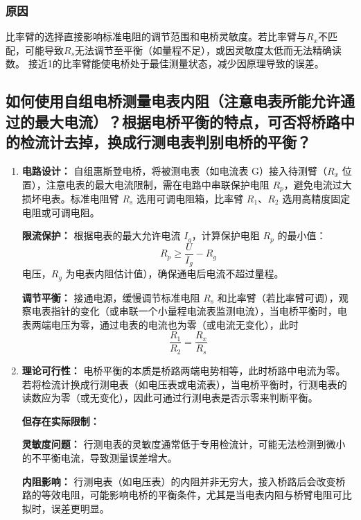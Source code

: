 \documentclass{../template/Report}%
\begin{document}
\begin{fullreportonly}
\subsubsection{原因}
比率臂的选择直接影响标准电阻的调节范围和电桥灵敏度。若比率臂与$R_x$不匹配，可能导致$R_s$无法调节至平衡（如量程不足），或因灵敏度太低而无法精确读数。
接近1的比率臂能使电桥处于最佳测量状态，减少因原理导致的误差。
\subsection{如何使用自组电桥测量电表内阻（注意电表所能允许通过的最大电流）？根据电桥平衡的特点，可否将桥路中的检流计去掉，换成行测电表判别电桥的平衡？}

\begin{enumerate}
    \item \textbf{电路设计：} 自组惠斯登电桥，将被测电表（如电流表 G）接入待测臂（$R_x$ 位置），注意电表的最大电流限制，需在电路中串联保护电阻 $R_p$，避免电流过大损坏电表。标准电阻臂 $R_s$ 选用可调电阻箱，比率臂 $R_1$、$R_2$ 选用高精度固定电阻或可调电阻。

    \textbf{限流保护：} 根据电表的最大允许电流 $I_g$，计算保护电阻 $R_p$ 的最小值：
    \[
        R_p \ge \frac{U}{I_g} - R_g
    \]
    电压，$R_g$ 为电表内阻估计值），确保通电后电流不超过量程。

    \textbf{调节平衡：} 接通电源，缓慢调节标准电阻 $R_s$ 和比率臂（若比率臂可调），观察电表指针的变化（或串联一个小量程电流表监测电流），当电桥平衡时，电表两端电压为零，通过电表的电流也为零（或电流无变化），此时
    \[
        \frac{R_1}{R_2} = \frac{R_x}{R_s}
    \]

    \item \textbf{理论可行性：} 电桥平衡的本质是桥路两端电势相等，此时桥路中电流为零。若将检流计换成行测电表（如电压表或电流表），当电桥平衡时，行测电表的读数应为零（或无变化），因此可通过行测电表是否示零来判断平衡。

    \textbf{但存在实际限制：}

    \textbf{灵敏度问题：} 行测电表的灵敏度通常低于专用检流计，可能无法检测到微小的不平衡电流，导致测量误差增大。

    \textbf{内阻影响：} 行测电表（如电压表）的内阻并非无穷大，接入桥路后会改变桥路的等效电阻，可能影响电桥的平衡条件，尤其是当电表内阻与桥臂电阻可比拟时，误差更明显。
\end{enumerate}
\end{fullreportonly}
\insertnotes
\end{document}
